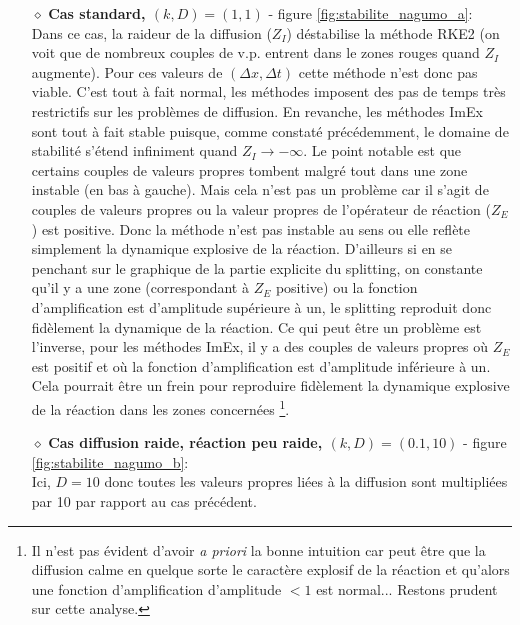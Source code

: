             \begin{itemize}
                \item[$\diamond$]\textbf{Cas standard, $(k,D)=(1,1)$} - figure \ref{fig:stabilite_nagumo_a}:\\
                    Dans ce cas, la raideur de la diffusion ($Z_I$) déstabilise la méthode RKE2 (on voit que de nombreux couples de v.p. entrent dans le zones rouges quand $Z_I$ augmente).
                    Pour ces valeurs de $(\Delta x, \Delta t)$ cette méthode n'est donc pas viable.
                    C'est tout à fait normal, les méthodes imposent des pas de temps très restrictifs sur les problèmes de diffusion.
                    En revanche, les méthodes ImEx sont tout à fait stable puisque, comme constaté précédemment, le domaine de stabilité s'étend infiniment quand $Z_I \rightarrow -\infty$.
                    Le point notable est que certains couples de valeurs propres tombent malgré tout dans une zone instable (en bas à gauche). Mais cela n'est pas un problème car il s'agit 
                    de couples de valeurs propres ou la valeur propres de l'opérateur de réaction ($Z_E$) est positive. Donc la méthode n'est pas instable au sens ou elle reflète simplement
                    la dynamique explosive de la réaction. D'ailleurs si en se penchant sur le graphique de la partie explicite du splitting, on constante qu'il y a une zone 
                    (correspondant à $Z_E$ positive) ou la fonction d'amplification est d'amplitude supérieure à un, le splitting reproduit donc fidèlement la dynamique de la réaction.
                    Ce qui peut être un problème est l'inverse, 
                    pour les méthodes ImEx, il y a des couples de valeurs propres où $Z_E$ est positif et où la fonction d'amplification est d'amplitude inférieure à un. 
                    Cela pourrait être un frein pour reproduire fidèlement la dynamique explosive de la réaction dans les zones concernées
                    \footnote{Il n'est pas évident d'avoir \textit{a priori} la bonne intuition car peut être que la diffusion calme en quelque sorte 
                    le caractère explosif de la réaction et qu'alors une fonction d'amplification d'amplitude $< 1$ est normal... Restons prudent sur cette analyse.}.
                \item[$\diamond$]\textbf{Cas diffusion raide, réaction peu raide, $(k,D)=(0.1,10)$}  - figure \ref{fig:stabilite_nagumo_b}:\\
                    Ici, $D=10$ donc toutes les valeurs propres liées à la diffusion sont multipliées par 10 par rapport au cas précédent. 

\end{itemize}
